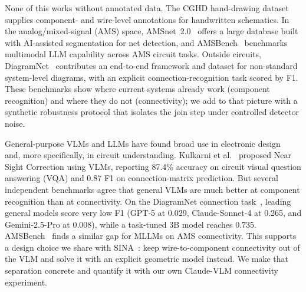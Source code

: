 \documentclass{ieeeaccess}
\begin{document}
None of this works without annotated data. The CGHD hand-drawing dataset~\cite{bayer2021cghd} supplies component- and wire-level annotations for handwritten schematics. In the analog/mixed-signal (AMS) space, AMSnet~2.0~\cite{amsnet2025} offers a large database built with AI-assisted segmentation for net detection, and AMSBench~\cite{amsbench2025} benchmarks multimodal LLM capability across AMS circuit tasks. Outside circuits, DiagramNet~\cite{diagramnet2026} contributes an end-to-end framework and dataset for non-standard system-level diagrams, with an explicit connection-recognition task scored by F1. These benchmarks show where current systems already work (component recognition) and where they do not (connectivity); we add to that picture with a synthetic robustness protocol that isolates the join step under controlled detector noise.

\label{sec:vlm_connectivity}
General-purpose VLMs and LLMs have found broad use in electronic design~\cite{llm4eda2024} and, more specifically, in circuit understanding. Kulkarni et al.~\cite{kulkarni2025enhancing} proposed Near Sight Correction using VLMs, reporting 87.4\% accuracy on circuit visual question answering (VQA) and 0.87 F1 on connection-matrix prediction. But several independent benchmarks agree that general VLMs are much better at component recognition than at connectivity. On the DiagramNet connection task~\cite{diagramnet2026}, leading general models score very low F1 (GPT-5 at 0.029, Claude-Sonnet-4 at 0.265, and Gemini-2.5-Pro at 0.008), while a task-tuned 3B model reaches 0.735. AMSBench~\cite{amsbench2025} finds a similar gap for MLLMs on AMS connectivity. This supports a design choice we share with SINA~\cite{sina2026}: keep wire-to-component connectivity out of the VLM and solve it with an explicit geometric model instead. We make that separation concrete and quantify it with our own Claude-VLM connectivity experiment.
\end{document}
